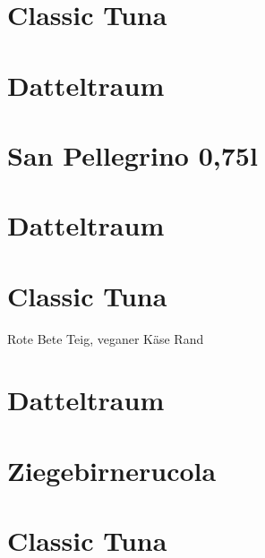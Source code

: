 \documentclass{article}
\begin{document}
\section*{Classic Tuna}

\section*{Datteltraum}

\section*{San Pellegrino 0,75l}

\section*{Datteltraum}

\section*{Classic Tuna}
Rote Bete Teig, veganer Käse Rand
\section*{Datteltraum}

\section*{Ziegebirnerucola}

\section*{Classic Tuna}
\end{document}
